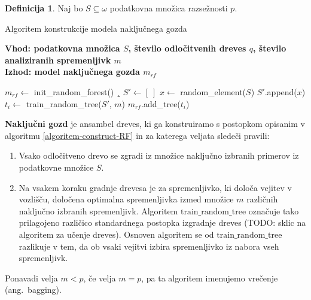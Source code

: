 \documentclass[12pt,a4paper,twoside]{article}
\theoremstyle{definition} %
\newtheorem{definicija}{Definicija}[section]
\theoremstyle{plain} %
\numberwithin{equation}{section}  %
\begin{document}
\begin{definicija}
Naj bo $S \subseteq \omega$ podatkovna množica razsežnosti $p$. 
\begin{algorithm}[ht]
	\caption{Algoritem konstrukcije modela naključnega gozda}
	\label{algoritem-construct-RF}
	\raggedright
	\textbf{Vhod: podatkovna množica $S$, število odločitvenih dreves $q$, število analiziranih spremenljivk $m$}  \\
	\textbf{Izhod: model naključnega gozda $m_{rf}$} 
	\begin{algorithmic}[0]
	  \State $m_{rf} \gets $ init\_random\_forest()
  ¸	\State $S' \gets [\ ]$
		  \State $x \gets$ random\_element($S$)
		  \State $S'$.append($x$)
	  \EndFor
	  \State $t_i \gets $ train\_random\_tree($S'$, $m$)
	  \State $m_{rf}$.add\_tree($t_i$)
	  \EndFor
	\end{algorithmic}
\end{algorithm}

\textbf{Naključni gozd} je ansambel dreves, ki ga konstruiramo s postopkom opisanim v algoritmu \ref{algoritem-construct-RF} in za katerega veljata sledeči pravili:

\begin{enumerate}
\item Vsako odločitveno drevo se zgradi iz množice naključno izbranih primerov iz podatkovne množice $S$.

\item Na vsakem koraku gradnje drevesa je za spremenljivko, ki določa vejitev v vozlišču, določena optimalna spremenljivka izmed množice $m$ različnih naključno izbranih spremenljivk. Algoritem $\mathrm{train\_random\_tree}$ označuje tako prilagojeno različico standardnega postopka izgradnje dreves (TODO: sklic na algoritem za učenje dreves). Osnoven algoritem se od $\mathrm{train\_random\_tree}$ razlikuje v tem, da ob vsaki vejitvi izbira spremenljivko iz nabora vseh spremenljivk.
\end{enumerate}

Ponavadi velja $m < p$, če velja $m=p$, pa ta algoritem imenujemo vrečenje (ang.~bagging).
\end{definicija}

\end{document}
